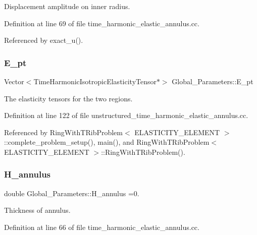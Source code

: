 Displacement amplitude on inner radius. 



Definition at line 69 of file time\+\_\+harmonic\+\_\+elastic\+\_\+annulus.\+cc.



Referenced by exact\+\_\+u().

\mbox{\label{namespaceGlobal__Parameters_a73c731fa617a9d92851e4195493262e7}} 
\subsubsection{\texorpdfstring{E\+\_\+pt}{E\_pt}}
{\footnotesize\ttfamily Vector$<$Time\+Harmonic\+Isotropic\+Elasticity\+Tensor$\ast$$>$ Global\+\_\+\+Parameters\+::\+E\+\_\+pt}



The elasticity tensors for the two regions. 



Definition at line 122 of file unstructured\+\_\+time\+\_\+harmonic\+\_\+elastic\+\_\+annulus.\+cc.



Referenced by Ring\+With\+T\+Rib\+Problem$<$ E\+L\+A\+S\+T\+I\+C\+I\+T\+Y\+\_\+\+E\+L\+E\+M\+E\+N\+T $>$\+::complete\+\_\+problem\+\_\+setup(), main(), and Ring\+With\+T\+Rib\+Problem$<$ E\+L\+A\+S\+T\+I\+C\+I\+T\+Y\+\_\+\+E\+L\+E\+M\+E\+N\+T $>$\+::\+Ring\+With\+T\+Rib\+Problem().

\mbox{\label{namespaceGlobal__Parameters_a0b73c5ead1114ae88bbd4cb0eb54f078}} 
\subsubsection{\texorpdfstring{H\+\_\+annulus}{H\_annulus}}
{\footnotesize\ttfamily double Global\+\_\+\+Parameters\+::\+H\+\_\+annulus =0.}



Thickness of annulus. 



Definition at line 66 of file time\+\_\+harmonic\+\_\+elastic\+\_\+annulus.\+cc.



